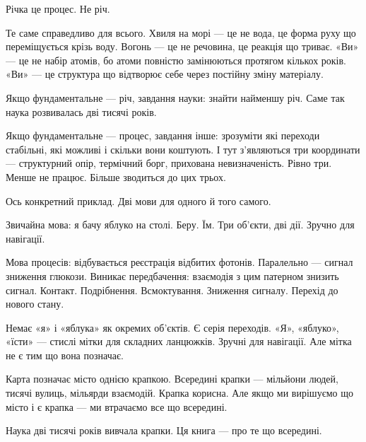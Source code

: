 \documentclass[12pt, a4paper, openany]{book}
\begin{document}
Річка це процес. Не річ.

Те саме справедливо для всього. Хвиля на морі --- це не вода, це форма руху що переміщується крізь воду. Вогонь --- це не речовина, це реакція що триває. «Ви» --- це не набір атомів, бо атоми повністю замінюються протягом кількох років. «Ви» --- це структура що відтворює себе через постійну зміну матеріалу.

Якщо фундаментальне --- річ, завдання науки: знайти найменшу річ. Саме так наука розвивалась дві тисячі років.

Якщо фундаментальне --- процес, завдання інше: зрозуміти які переходи стабільні, які можливі і скільки вони коштують. І тут з'являються три координати --- структурний опір, термічний борг, прихована невизначеність. Рівно три. Менше не працює. Більше зводиться до цих трьох.

Ось конкретний приклад. Дві мови для одного й того самого.

Звичайна мова: я бачу яблуко на столі. Беру. Їм. Три об'єкти, дві дії. Зручно для навігації.

Мова процесів: відбувається реєстрація відбитих фотонів. Паралельно --- сигнал зниження глюкози. Виникає передбачення: взаємодія з цим патерном знизить сигнал. Контакт. Подрібнення. Всмоктування. Зниження сигналу. Перехід до нового стану.

Немає «я» і «яблука» як окремих об'єктів. Є серія переходів. «Я», «яблуко», «їсти» --- стислі мітки для складних ланцюжків. Зручні для навігації. Але мітка не є тим що вона позначає.

\begin{analogybox}
Карта позначає місто однією крапкою. Всередині крапки --- мільйони людей, тисячі вулиць, мільярди взаємодій. Крапка корисна. Але якщо ми вирішуємо що місто і є крапка --- ми втрачаємо все що всередині.
\end{analogybox}

Наука дві тисячі років вивчала крапки. Ця книга --- про те що всередині.
\end{document}
